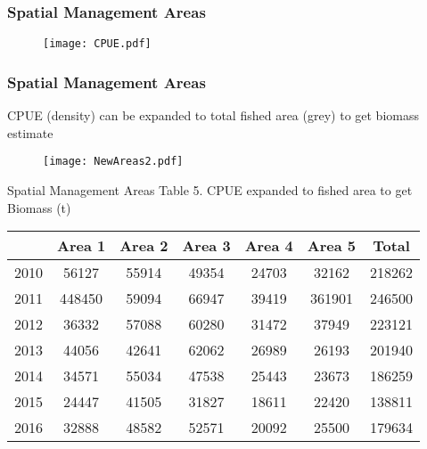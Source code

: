\documentclass{beamer}
\begin{document}
\begin{frame}
\frametitle{Spatial Management Areas}

\begin{figure}
        \begin{center}
            \texttt{[image: CPUE.pdf]}
        \end{center}
    \end{figure}


\end{frame}



\begin{frame}
\frametitle{Spatial Management Areas}
CPUE (density) can be expanded to total fished area (grey) to get biomass estimate

\begin{figure}
        \begin{center}
            \texttt{[image: NewAreas2.pdf]}
        \end{center}
    \end{figure}


\end{frame}


\begin{frame}{Spatial Management Areas}
Table 5. CPUE expanded to fished area to get Biomass (t)
\centering
\begin{tabular}{|c|c|c|c|c|c|c|}
\hline
& Area 1 & Area 2 & Area 3 & Area 4 & Area 5 & Total \\
\hline
2010 & 56127 & 55914 & 49354 & 24703 & 32162 & 218262 \\
\hline
2011 & 448450 &	59094 &	66947 &	39419 &	361901 & 246500 \\
\hline
2012 & 36332 & 57088 & 60280 & 31472 & 37949 & 223121 \\
\hline
2013 & 44056 & 42641 & 62062 & 26989 & 26193 & 201940 \\
\hline
2014 & 34571 & 55034 & 47538 & 25443 & 23673 & 186259 \\
\hline
2015 & 24447 & 41505 & 31827 & 18611 & 22420 & 138811 \\
\hline
2016 & 32888 & 48582 & 52571 & 20092 & 25500 & 179634 \\
\hline
 
\end{tabular}
\end{frame}
 
\end{document}
